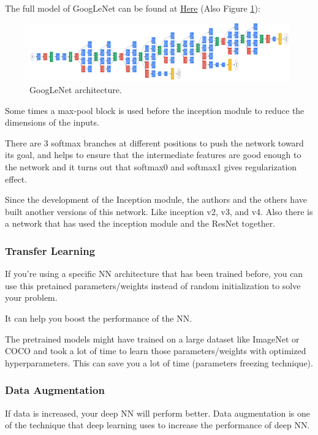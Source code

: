 The full model of GoogLeNet \cite{szegedy2015going} can be found at \href{https://nbviewer.jupyter.org/github/mbadry1/DeepLearning.ai-Summary/blob/master/4-\%20Convolutional\%20Neural\%20Networks/Images/15.png}{Here} (Also Figure \ref{googlenet}):


\begin{figure}[!htbp]
    \centering 
    \includegraphics[width=1.1\textwidth, trim={0 0 0 0}, clip]{img/c4/google-net2.png}
    \caption{GoogLeNet architecture.}
    \label{googlenet}
\end{figure}

Some times a max-pool block is used before the inception module to reduce the dimensions of the inputs.

There are 3 softmax branches at different positions to push the network toward its goal, and helps to ensure that the intermediate features are good enough to the network and it turns out that softmax0 and softmax1 gives regularization effect.

Since the development of the Inception module, the authors and the others have built another versions of this network. Like inception v2, v3, and v4. Also there is a network that has used the inception module and the ResNet together.

\subsubsection{Transfer Learning}
If you're using a specific NN architecture that has been trained before, you can use this pretained parameters/weights instead of random initialization to solve your problem.

It can help you boost the performance of the NN.

The pretrained models might have trained on a large dataset like ImageNet or COCO and took a lot of time to learn those parameters/weights with optimized hyperparameters. This can save you a lot of time (parameters freezing technique).

\subsubsection{Data Augmentation}
If data is increased, your deep NN will perform better. Data augmentation is one of the technique that deep learning uses to increase the performance of deep NN.

